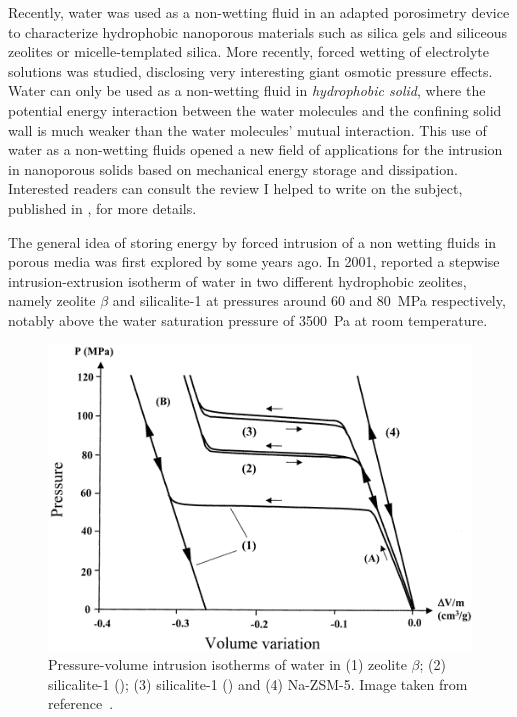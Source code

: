 \documentclass[thesis]{subfiles}
\begin{document}
Recently, water was used as a non-wetting fluid in an adapted porosimetry device
to characterize hydrophobic nanoporous materials such as silica
gels\cite{Fadeev1997} and siliceous zeolites\cite{Eroshenko2001, Eroshenko2002}
or micelle-templated silica\cite{Lefevre2004}. More recently, forced wetting of
electrolyte solutions was studied, disclosing very interesting giant osmotic
pressure effects\cite{Liu2009, MichelinJamois2015}. Water can only be used as a
non-wetting fluid in \emph{hydrophobic solid}, where the potential energy
interaction between the water molecules and the confining solid wall is much
weaker than the water molecules' mutual interaction. This use of water as a
non-wetting fluids opened a new field of applications for the intrusion in
nanoporous solids based on mechanical energy storage and
dissipation\cite{Eroshenko2001, Fraux2017-2}. Interested readers can consult the
review I helped to write on the subject, published in
\cite{Fraux2017-2}, for more details.

The general idea of storing energy by forced intrusion of a non wetting fluids
in porous media was first explored by \citeauthor{Fadeev1997} some years
ago\cite{Fadeev1997}. In 2001, \citeauthor{Eroshenko2001}\cite{Eroshenko2001}
reported a stepwise intrusion-extrusion isotherm of water in two different
hydrophobic zeolites, namely zeolite $\beta$ and silicalite-1 at pressures
around 60 and \SI{80}{MPa} respectively, \ie notably above the water saturation
pressure of \SI{3 500}{Pa} at room temperature.

\begin{figure}[ht]
    \centering
    \includegraphics[width=0.75\linewidth]{figures/cited/intrusion-zeosil}
    \caption{Pressure-volume intrusion isotherms of water in (1) zeolite
    $\beta$; (2) silicalite-1 (); (3) silicalite-1 () and (4)
    Na-ZSM-5. Image taken from reference~\cite{Eroshenko2001}.}
    \label{fig:intrusion-zeosil}
\end{figure}
\end{document}

